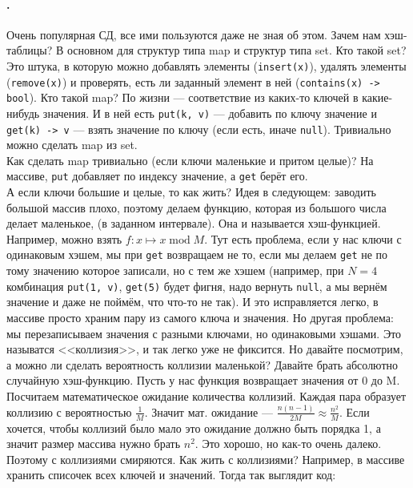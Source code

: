 \documentclass{article}
\newcommand{\pseudo}{PseudoLexer.py:PseudoLexer -x}
\newcommand{\pseudocode}[1]{\texttt{#1}}
\begin{document}
    \paragraph{.}
    Очень популярная СД, все ими пользуются даже не зная об этом. Зачем нам хэш-таблицы? В основном для структур типа map и структур типа set. Кто такой set? Это штука, в которую можно добавлять элементы (\pseudocode{insert(x)}), удалять элементы (\pseudocode{remove(x)}) и проверять, есть ли заданный элемент в ней (\pseudocode{contains(x) -> bool}). Кто такой map? По жизни --- соответствие из каких-то ключей в какие-нибудь значения. И в ней есть \pseudocode{put(k, v)} --- добавить по ключу значение и \pseudocode{get(k) -> v} --- взять значение по ключу (если есть, иначе \pseudocode{null}). Тривиально можно сделать map из set.\\
    Как сделать map тривиально (если ключи маленькие и притом целые)? На массиве, \pseudocode{put} добавляет по индексу значение, а \pseudocode{get} берёт его.\\
    А если ключи большие и целые, то как жить? Идея в следующем: заводить большой массив плохо, поэтому делаем функцию, которая из большого числа делает маленькое, (в заданном интервале). Она и называется хэш-функцией. Например, можно взять $f\colon x\mapsto x\operatorname{mod} M$. Тут есть проблема, если у нас ключи с одинаковым хэшем, мы при \pseudocode{get} возвращаем не то, если мы делаем \pseudocode{get} не по тому значению которое записали, но с тем же хэшем (например, при $N=4$ комбинация \pseudocode{put(1, v)}, \pseudocode{get(5)} будет фигня, надо вернуть \pseudocode{null}, а мы вернём значение и даже не поймём, что что-то не так). И это исправляется легко, в массиве просто храним пару из самого ключа и значения. Но другая проблема: мы перезаписываем значения с разными ключами, но одинаковыми хэшами. Это называтся <<коллизия>>, и так легко уже не фиксится. Но давайте посмотрим, а можно ли сделать вероятность коллизии маленькой? Давайте брать абсолютно случайную хэш-функцию. Пусть у нас функция возвращает значения от 0 до M. Посчитаем математическое ожидание количества коллизий. Каждая пара образует коллизию с вероятностью $\frac1M$. Значит мат. ожидание --- $\frac{n(n-1)}{2M}\approx\frac{n^2}M$. Если хочется, чтобы коллизий было мало это ожидание должно быть порядка 1, а значит размер массива нужно брать $n^2$. Это хорошо, но как-то очень далеко.\\
    Поэтому с коллизиями смиряются. Как жить с коллизиями? Например, в массиве хранить списочек всех ключей и значений. Тогда так выглядит код:
\end{document}
